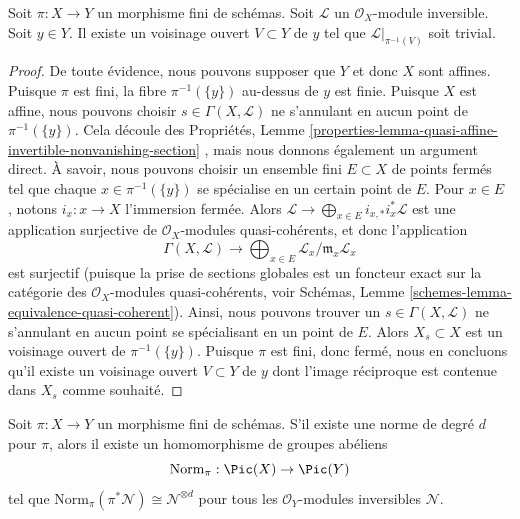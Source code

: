 \begin{lemma}
\label{lemma-finite-trivialize-invertible-upstairs}
Soit  $\pi : X \to Y$  un morphisme fini de schémas. Soit  $\mathcal{L}$  un
 $\mathcal{O}_X$-module inversible. Soit  $y \in Y$. Il existe un voisinage ouvert
 $V \subset Y$  de  $y$  tel que  $\mathcal{L}|_{\pi^{-1}(V)}$  soit trivial.
\end{lemma}

\begin{proof}
De toute évidence, nous pouvons supposer que  $Y$  et donc  $X$ 
sont affines. Puisque  $\pi$  est fini, la fibre  $\pi^{-1}(\{y\})$  au-dessus de
 $y$  est finie. Puisque  $X$  est affine, nous pouvons choisir
 $s \in \Gamma(X, \mathcal{L})$  ne s'annulant en aucun point de  $\pi^{-1}(\{y\})$. Cela découle des
Propriétés, Lemme  \ref{properties-lemma-quasi-affine-invertible-nonvanishing-section} , mais nous donnons également un argument direct. À
savoir, nous pouvons choisir un ensemble fini  $E \subset X$  de points fermés tel
que chaque  $x \in \pi^{-1}(\{y\})$  se spécialise en un certain point de  $E$. Pour
 $x \in E$ , notons  $i_x : x \to X$  l'immersion fermée. Alors  $\mathcal{L} \to \bigoplus_{x \in E} i_{x, *}i_x^*\mathcal{L}$  est une
application surjective de  $\mathcal{O}_X$-modules quasi-cohérents, et donc
l'application
$$
\Gamma(X, \mathcal{L}) \to
\bigoplus\nolimits_{x \in E} \mathcal{L}_x/\mathfrak m_x\mathcal{L}_x
$$
est surjectif (puisque la prise de sections globales est un foncteur exact sur la
catégorie des  $\mathcal{O}_X$-modules quasi-cohérents, voir Schémas, Lemme
 \ref{schemes-lemma-equivalence-quasi-coherent}). Ainsi, nous pouvons trouver un  $s \in \Gamma(X, \mathcal{L})$  ne s'annulant en aucun
point se spécialisant en un point de  $E$. Alors  $X_s \subset X$  est un
voisinage ouvert de  $\pi^{-1}(\{y\})$. Puisque  $\pi$  est fini, donc fermé, nous
en concluons qu'il existe un voisinage ouvert  $V \subset Y$  de  $y$  dont
l'image réciproque est contenue dans  $X_s$  comme souhaité.
\end{proof}

\begin{lemma}
\label{lemma-norm-invertible}
Soit  $\pi : X \to Y$  un morphisme fini de schémas. S'il existe une norme de degré
 $d$  pour  $\pi$, alors il existe un homomorphisme de groupes
abéliens
$$
\text{Norm}_\pi : \Pic(X) \to \Pic(Y)
$$
tel que  $\text{Norm}_\pi(\pi^*\mathcal{N}) \cong \mathcal{N}^{\otimes d}$  pour tous les  $\mathcal{O}_Y$-modules inversibles  $\mathcal{N}$.
\end{lemma}

